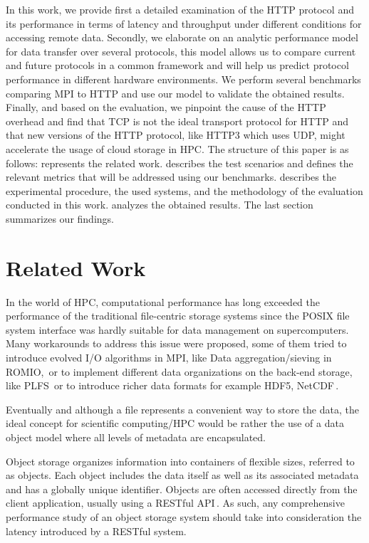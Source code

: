 \documentclass[runningheads]{llncs}
\begin{document}
In this work, we provide first a detailed examination of the HTTP protocol and its performance in terms of latency and throughput under different conditions for accessing remote data. Secondly, we elaborate on an analytic performance model for data transfer over several protocols, this model allows us to compare current and future protocols in a common framework and will help us predict protocol performance in different hardware environments. We perform several benchmarks comparing MPI to HTTP and use our model to validate the obtained results. Finally, and based on the evaluation, we pinpoint the cause of the HTTP overhead and find that TCP is not the ideal transport protocol for HTTP and that new versions of the HTTP protocol, like HTTP3 which uses UDP, might accelerate the usage of cloud storage in HPC.
The structure of this paper is as follows:  represents the related work.  describes the test scenarios and defines the relevant metrics that will be addressed using our benchmarks.  describes the experimental procedure, the used systems, and the methodology of the evaluation conducted in this work.  analyzes the obtained results. The last section summarizes our findings.


\section {Related Work} \label{sec:related}

In the world of HPC, computational performance has long exceeded the performance of the traditional file-centric storage systems since the POSIX file system interface was hardly suitable for data management on supercomputers\cite{zadok2017posix}.
Many workarounds to address this issue were proposed, some of them tried to introduce evolved I/O algorithms in MPI, like Data aggregation/sieving in ROMIO,\,\cite{datasievingromio} or to implement different data organizations on the back-end storage, like PLFS\,\cite{bent2009plfs} or to introduce richer data formats for example HDF5, NetCDF\,\cite{hdf5}.

Eventually and although a file represents a convenient way to store the data, the ideal concept for scientific computing/HPC would be rather the use of a data object model\cite{liu2018evaluation} where all levels of metadata are encapsulated. 

Object storage organizes information into containers of flexible sizes, referred to as objects. Each object includes the data itself as well as its associated metadata and has a globally unique identifier.
Objects are often accessed directly from the client application, usually using a RESTful API\,\cite{richardson2008restful}.
As such, any comprehensive performance study of an object storage system should take into consideration the latency introduced by a RESTful system.
\end{document}
